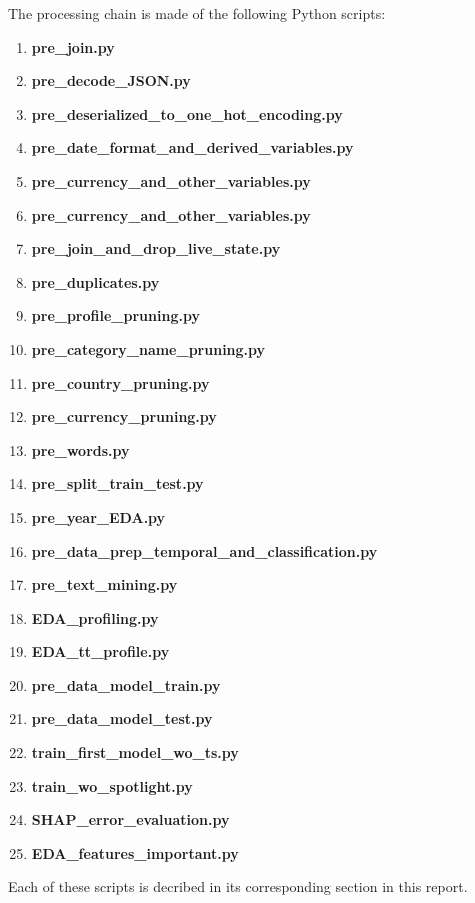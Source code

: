 \documentclass{article}
\begin{document}
The processing chain is made of the following Python scripts:
\begin{enumerate}
\item \textbf{pre\_join.py}
\item \textbf{pre\_decode\_JSON.py}
\item \textbf{pre\_deserialized\_to\_one\_hot\_encoding.py}
\item \textbf{pre\_date\_format\_and\_derived\_variables.py}
\item \textbf{pre\_currency\_and\_other\_variables.py}
\item \textbf{pre\_currency\_and\_other\_variables.py}
\item \textbf{pre\_join\_and\_drop\_live\_state.py}
\item \textbf{pre\_duplicates.py}
\item \textbf{pre\_profile\_pruning.py}
\item \textbf{pre\_category\_name\_pruning.py}
\item \textbf{pre\_country\_pruning.py}
\item \textbf{pre\_currency\_pruning.py}
\item \textbf{pre\_words.py}
\item \textbf{pre\_split\_train\_test.py}
\item \textbf{pre\_year\_EDA.py}
\item \textbf{pre\_data\_prep\_temporal\_and\_classification.py}
\item \textbf{pre\_text\_mining.py}
\item \textbf{EDA\_profiling.py}
\item \textbf{EDA\_tt\_profile.py}
\item \textbf{pre\_data\_model\_train.py}
\item \textbf{pre\_data\_model\_test.py}
\item \textbf{train\_first\_model\_wo\_ts.py}
\item \textbf{train\_wo\_spotlight.py}
\item \textbf{SHAP\_error\_evaluation.py}
\item \textbf{EDA\_features\_important.py}
\end{enumerate}

Each of these scripts is decribed in its corresponding section in this report.
\end{document}

